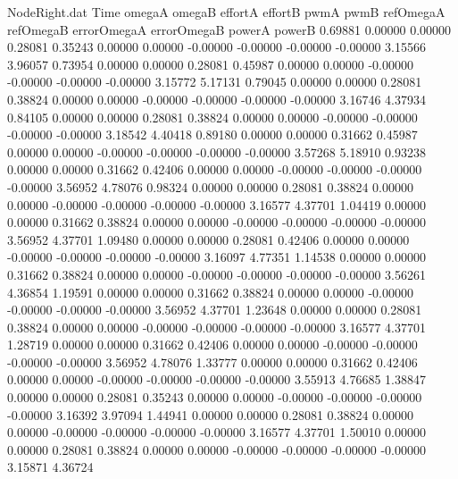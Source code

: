 \begin{filecontents}{NodeRight.dat}
Time omegaA omegaB effortA effortB pwmA pwmB refOmegaA refOmegaB errorOmegaA errorOmegaB powerA powerB
   0.69881    0.00000    0.00000     0.28081    0.35243    0.00000    0.00000   -0.00000   -0.00000   -0.00000   -0.00000    3.15566    3.96057
   0.73954    0.00000    0.00000     0.28081    0.45987    0.00000    0.00000   -0.00000   -0.00000   -0.00000   -0.00000    3.15772    5.17131
   0.79045    0.00000    0.00000     0.28081    0.38824    0.00000    0.00000   -0.00000   -0.00000   -0.00000   -0.00000    3.16746    4.37934
   0.84105    0.00000    0.00000     0.28081    0.38824    0.00000    0.00000   -0.00000   -0.00000   -0.00000   -0.00000    3.18542    4.40418
   0.89180    0.00000    0.00000     0.31662    0.45987    0.00000    0.00000   -0.00000   -0.00000   -0.00000   -0.00000    3.57268    5.18910
   0.93238    0.00000    0.00000     0.31662    0.42406    0.00000    0.00000   -0.00000   -0.00000   -0.00000   -0.00000    3.56952    4.78076
   0.98324    0.00000    0.00000     0.28081    0.38824    0.00000    0.00000   -0.00000   -0.00000   -0.00000   -0.00000    3.16577    4.37701
   1.04419    0.00000    0.00000     0.31662    0.38824    0.00000    0.00000   -0.00000   -0.00000   -0.00000   -0.00000    3.56952    4.37701
   1.09480    0.00000    0.00000     0.28081    0.42406    0.00000    0.00000   -0.00000   -0.00000   -0.00000   -0.00000    3.16097    4.77351
   1.14538    0.00000    0.00000     0.31662    0.38824    0.00000    0.00000   -0.00000   -0.00000   -0.00000   -0.00000    3.56261    4.36854
   1.19591    0.00000    0.00000     0.31662    0.38824    0.00000    0.00000   -0.00000   -0.00000   -0.00000   -0.00000    3.56952    4.37701
   1.23648    0.00000    0.00000     0.28081    0.38824    0.00000    0.00000   -0.00000   -0.00000   -0.00000   -0.00000    3.16577    4.37701
   1.28719    0.00000    0.00000     0.31662    0.42406    0.00000    0.00000   -0.00000   -0.00000   -0.00000   -0.00000    3.56952    4.78076
   1.33777    0.00000    0.00000     0.31662    0.42406    0.00000    0.00000   -0.00000   -0.00000   -0.00000   -0.00000    3.55913    4.76685
   1.38847    0.00000    0.00000     0.28081    0.35243    0.00000    0.00000   -0.00000   -0.00000   -0.00000   -0.00000    3.16392    3.97094
   1.44941    0.00000    0.00000     0.28081    0.38824    0.00000    0.00000   -0.00000   -0.00000   -0.00000   -0.00000    3.16577    4.37701
   1.50010    0.00000    0.00000     0.28081    0.38824    0.00000    0.00000   -0.00000   -0.00000   -0.00000   -0.00000    3.15871    4.36724

\end{filecontents}
